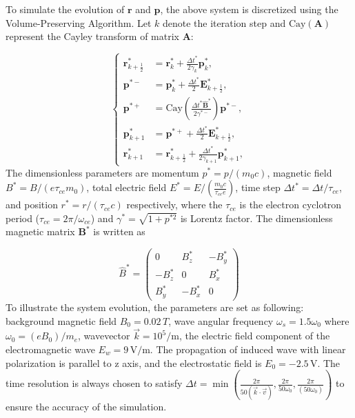 \documentclass{cpbtex}
\begin{document}
\begin{CJK*}{GBK}{song}
To simulate the evolution of $\bm{r}$ and $\bm{p}$, the above system is discretized using the Volume-Preserving Algorithm. Let $k$ denote the iteration step and $\text{Cay}(\bm{A})$ represent the Cayley transform of matrix $\bm{A}$:

\begin{equation}
\left\{
\begin{aligned}
\bm{r}^*_{k+\frac{1}{2}} &= \bm{r}^*_k + \frac{\Delta t^*}{2 \gamma_k} \bm{p}^*_k, \\
\bm{p}^{*-} &= \bm{p}^*_k + \frac{\Delta t^*}{2} \bm{E}^*_{k+\frac{1}{2}}, \\
\bm{p}^{*+} &= \text{Cay} \left( \frac{\Delta t^* \hat{\bm{B}}^*}{2 \gamma^{*-}} \right) \bm{p}^{*-}, \\
\bm{p}^*_{k+1} &= \bm{p}^{*+} + \frac{\Delta t^*}{2} \bm{E}^*_{k+\frac{1}{2}}, \\
\bm{r}^*_{k+1} &= \bm{r}^*_{k+\frac{1}{2}} + \frac{\Delta t^*}{2 \gamma_{k+1}} \bm{p}^*_{k+1},
\end{aligned}
\right.
\end{equation}
The dimensionless parameters are momentum \( p^* = p/(m_0 c) \), magnetic field \( B^* = B/(e \tau_{ce} m_0) \), total electric field \( E^* = E/(\frac{m_0 c}{\tau_{ce} e}) \), time step \( \Delta t^* = \Delta t / \tau_{ce} \), and position \( r^* = r / (\tau_{ce} c) \) respectively, where the \( \tau_{ce} \) is the electron cyclotron period (\( \tau_{ce} = 2\pi / \omega_{ce} \)) and \( \gamma^* = \sqrt{1 + p^{*2}} \) is Lorentz factor. The dimensionless magnetic matrix \( \mathbf{B}^* \) \cite{zhang2015volume} is written as

\begin{equation}
\hat{B}^* =
\begin{pmatrix}
0 & B_z^* & -B_y^* \\
-B_z^* & 0 & B_x^* \\
B_y^* & -B_x^* & 0
\end{pmatrix}
\end{equation}
To illustrate the system evolution, the parameters are set as following: background magnetic field \( B_0 = 0.02\,T \), wave angular frequency \( \omega_s = 1.5 \omega_0 \) where \( \omega_0 = (e B_0)/m_e \), wavevector \( \vec{k} = 10^5/\mathrm{m} \), the electric field component of the electromagnetic wave \( E_w = 9\,\mathrm{V/m} \). The propagation of induced wave with linear polarization is parallel to z axis, and the electrostatic field is \( E_0 = -2.5\,\mathrm{V} \). The time resolution is always chosen to satisfy 
\(
\Delta t = \min \left( \frac{2\pi}{50(\vec{k} \cdot \vec{v})}, \frac{2\pi}{50\omega_0}, \frac{2\pi}{(50\omega_0)} \right)
\)
to ensure the accuracy of the simulation.


\end{CJK*}
\end{document}
